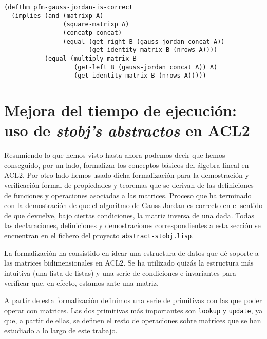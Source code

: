 \documentclass[a4paper,10pt]{article}
\begin{document}
\begin{lstlisting}[language=clips]
(defthm pfm-gauss-jordan-is-correct
  (implies (and (matrixp A) 
                (square-matrixp A)
                (concatp concat)
                (equal (get-right B (gauss-jordan concat A)) 
                       (get-identity-matrix B (nrows A))))
           (equal (multiply-matrix B 
                   (get-left B (gauss-jordan concat A)) A)
                   (get-identity-matrix B (nrows A)))))
\end{lstlisting}

\newpage
\vspace{24pt}
\section{Mejora del tiempo de ejecución: uso de \emph{stobj's abstractos} en ACL2}

Resumiendo lo que hemos visto hasta ahora podemos decir que hemos conseguido, por un lado, formalizar los conceptos básicos del álgebra lineal en ACL2. Por otro lado hemos usado dicha formalización para la demostración y verificación formal de propiedades y teoremas que se derivan de las definiciones de funciones y operaciones asociadas a las matrices. Proceso que ha terminado con la demostración de que el algoritmo de Gauss-Jordan es correcto en el sentido de que devuelve, bajo ciertas condiciones, la matriz inversa de una dada. Todas las declaraciones, definiciones y demostraciones correspondientes a esta sección se encuentran en el fichero del proyecto \texttt{abstract-stobj.lisp}. 

\par \vspace{10pt}

La formalización ha consistido en idear una estructura de datos que dé soporte a las matrices bidimensionales en ACL2. Se ha utilizado quizás la estructura más intuitiva (una lista de listas) y una serie de condiciones e invariantes para verificar que, en efecto, estamos ante una matriz.

\par \vspace{10pt}

A partir de esta formalización definimos una serie de primitivas con las que poder operar con matrices. Las dos primitivas más importantes son \texttt{lookup} y \texttt{update}, ya que, a partir de ellas, se definen el resto de operaciones sobre matrices que se han estudiado a lo largo de este trabajo.
\end{document}
